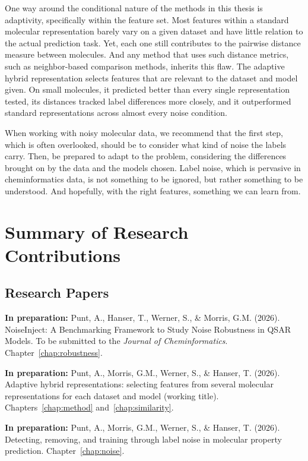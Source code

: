 One way around the conditional nature of the methods in this thesis is adaptivity, specifically within the feature set. Most features within a standard molecular representation barely vary on a given dataset and have little relation to the actual prediction task. Yet, each one still contributes to the pairwise distance measure between molecules. And any method that uses such distance metrics, such as neighbor-based comparison methods, inherits this flaw. The adaptive hybrid representation selects features that are relevant to the dataset and model given. On small molecules, it predicted better than every single representation tested, its distances tracked label differences more closely, and it outperformed standard representations across almost every noise condition.

When working with noisy molecular data, we recommend that the first step, which is often overlooked, should be to consider what kind of noise the labels carry. Then, be prepared to adapt to the problem, considering the differences brought on by the data and the models chosen. Label noise, which is pervasive in cheminformatics data, is not something to be ignored, but rather something to be understood. And hopefully, with the right features, something we can learn from. 

\pagebreak

\chapter*{Summary of Research Contributions}

\section*{Research Papers}
\textbf{In preparation:} Punt, A., Hanser, T., Werner, S., \& Morris, G.M. (2026). NoiseInject: A Benchmarking Framework to Study Noise Robustness in QSAR Models. To be submitted to the \textit{Journal of Cheminformatics}. Chapter~\ref{chap:robustness}.

\textbf{In preparation:} Punt, A., Morris, G.M., Werner, S., \& Hanser, T. (2026). Adaptive hybrid representations: selecting features from several molecular representations for each dataset and model (working title). Chapters~\ref{chap:method} and~\ref{chap:similarity}.

\textbf{In preparation:} Punt, A., Morris, G.M., Werner, S., \& Hanser, T. (2026). Detecting, removing, and training through label noise in molecular property prediction. Chapter~\ref{chap:noise}.

